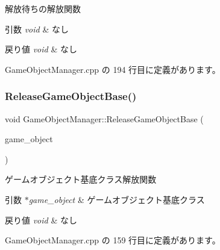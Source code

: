 解放待ちの解放関数 


\begin{DoxyParams}{引数}
{\em void} & なし \\
\hline
\end{DoxyParams}

\begin{DoxyRetVals}{戻り値}
{\em void} & なし \\
\hline
\end{DoxyRetVals}


 Game\+Object\+Manager.\+cpp の 194 行目に定義があります。

\mbox{\label{class_game_object_manager_a0293d3dca4c52d908da0906d982b44cc}} 
\subsubsection{\texorpdfstring{Release\+Game\+Object\+Base()}{ReleaseGameObjectBase()}}
{\footnotesize\ttfamily void Game\+Object\+Manager\+::\+Release\+Game\+Object\+Base (\begin{DoxyParamCaption}\item[{\mbox{\hyperlink{class_game_object_base}{Game\+Object\+Base}} $\ast$}]{game\+\_\+object }\end{DoxyParamCaption})}



ゲームオブジェクト基底クラス解放関数 


\begin{DoxyParams}{引数}
{\em $\ast$game\+\_\+object} & ゲームオブジェクト基底クラス \\
\hline
\end{DoxyParams}

\begin{DoxyRetVals}{戻り値}
{\em void} & なし \\
\hline
\end{DoxyRetVals}


 Game\+Object\+Manager.\+cpp の 159 行目に定義があります。

\mbox{\label{class_game_object_manager_a01636a5f8fb099ab0633fad06755be0e}} 
